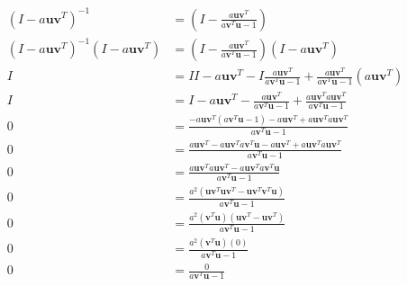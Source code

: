 \documentclass[letterpaper,12pt]{article}
\theoremstyle{definition}
\begin{document}
\begin{align*}
    (I-a\textbf{u}\textbf{v}^T)^{-1} &= \left( I - \frac{a\textbf{u}\textbf{v}^T}{a\textbf{v}^T\textbf{u}-1} \right)\\
    (I-a\textbf{u}\textbf{v}^T)^{-1}(I-a\textbf{u}\textbf{v}^T) &= \left( I - \frac{a\textbf{u}\textbf{v}^T}{a\textbf{v}^T\textbf{u}-1} \right)(I-a\textbf{u}\textbf{v}^T) \\
    I &= II  - a\textbf{u}\textbf{v}^T - I\frac{a\textbf{u}\textbf{v}^T}{a\textbf{v}^T\textbf{u}-1} + \frac{a\textbf{u}\textbf{v}^T}{a\textbf{v}^T\textbf{u}-1}(a\textbf{u}\textbf{v}^T) \\
    I &= I  - a\textbf{u}\textbf{v}^T - \frac{a\textbf{u}\textbf{v}^T}{a\textbf{v}^T\textbf{u}-1} + \frac{a\textbf{u}\textbf{v}^Ta\textbf{u}\textbf{v}^T}{a\textbf{v}^T\textbf{u}-1} \\
    0 &= \frac{- a\textbf{u}\textbf{v}^T(a\textbf{v}^T\textbf{u}-1) - a\textbf{u}\textbf{v}^T + a\textbf{u}\textbf{v}^Ta\textbf{u}\textbf{v}^T}{a\textbf{v}^T\textbf{u}-1} \\
    0 &= \frac{ a\textbf{u}\textbf{v}^T-a\textbf{u}\textbf{v}^Ta\textbf{v}^T\textbf{u} - a\textbf{u}\textbf{v}^T + a\textbf{u}\textbf{v}^Ta\textbf{u}\textbf{v}^T}{a\textbf{v}^T\textbf{u}-1} \\
    0 &= \frac{  a\textbf{u}\textbf{v}^Ta\textbf{u}\textbf{v}^T-a\textbf{u}\textbf{v}^Ta\textbf{v}^T\textbf{u}}{a\textbf{v}^T\textbf{u}-1} \\
    0 &= \frac{  a^2(\textbf{u}\textbf{v}^T\textbf{u}\textbf{v}^T-\textbf{u}\textbf{v}^T\textbf{v}^T\textbf{u})}{a\textbf{v}^T\textbf{u}-1} \\
    0 &= \frac{  a^2(\textbf{v}^T\textbf{u})(\textbf{u}\textbf{v}^T-\textbf{u}\textbf{v}^T)}{a\textbf{v}^T\textbf{u}-1} \\
    0 &= \frac{  a^2(\textbf{v}^T\textbf{u})(0)}{a\textbf{v}^T\textbf{u}-1} \\
    0 &= \frac{0}{a\textbf{v}^T\textbf{u}-1} \\
\end{align*}
\end{document}
